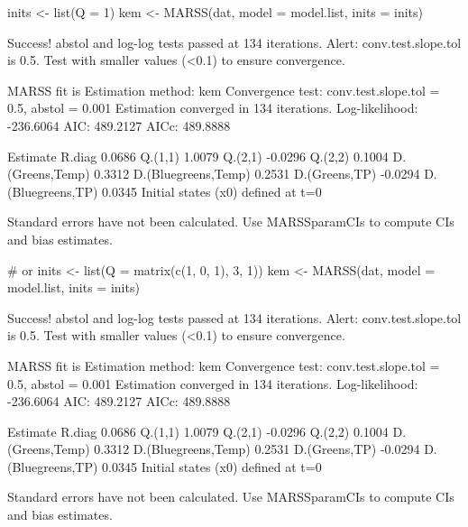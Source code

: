 \begin{Schunk}
\begin{Sinput}
 inits <- list(Q = 1)
 kem <- MARSS(dat, model = model.list, inits = inits)
\end{Sinput}
\begin{Soutput}
Success! abstol and log-log tests passed at 134 iterations.
Alert: conv.test.slope.tol is 0.5.
Test with smaller values (<0.1) to ensure convergence.

MARSS fit is
Estimation method: kem 
Convergence test: conv.test.slope.tol = 0.5, abstol = 0.001
Estimation converged in 134 iterations. 
Log-likelihood: -236.6064 
AIC: 489.2127   AICc: 489.8888   
 
                    Estimate
R.diag                0.0686
Q.(1,1)               1.0079
Q.(2,1)              -0.0296
Q.(2,2)               0.1004
D.(Greens,Temp)       0.3312
D.(Bluegreens,Temp)   0.2531
D.(Greens,TP)        -0.0294
D.(Bluegreens,TP)     0.0345
Initial states (x0) defined at t=0

Standard errors have not been calculated. 
Use MARSSparamCIs to compute CIs and bias estimates.
\end{Soutput}
\begin{Sinput}
 # or
 inits <- list(Q = matrix(c(1, 0, 1), 3, 1))
 kem <- MARSS(dat, model = model.list, inits = inits)
\end{Sinput}
\begin{Soutput}
Success! abstol and log-log tests passed at 134 iterations.
Alert: conv.test.slope.tol is 0.5.
Test with smaller values (<0.1) to ensure convergence.

MARSS fit is
Estimation method: kem 
Convergence test: conv.test.slope.tol = 0.5, abstol = 0.001
Estimation converged in 134 iterations. 
Log-likelihood: -236.6064 
AIC: 489.2127   AICc: 489.8888   
 
                    Estimate
R.diag                0.0686
Q.(1,1)               1.0079
Q.(2,1)              -0.0296
Q.(2,2)               0.1004
D.(Greens,Temp)       0.3312
D.(Bluegreens,Temp)   0.2531
D.(Greens,TP)        -0.0294
D.(Bluegreens,TP)     0.0345
Initial states (x0) defined at t=0

Standard errors have not been calculated. 
Use MARSSparamCIs to compute CIs and bias estimates.
\end{Soutput}
\end{Schunk}
